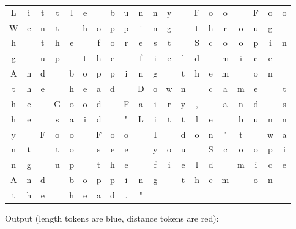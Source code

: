 \documentclass[12pt]{article}
\begin{document}
\begin{table}[H]
\ttfamily
\begin{tabular}{cccccccccccccccccccc}
L & i & t & t & l & e &  & b & u & n & n & y &  & F & o & o &  & F & o & o \\
W & e & n & t &  & h & o & p & p & i & n & g &  & t & h & r & o & u & g \\
h &  & t & h & e &  & f & o & r & e & s & t &  & S & c & o & o & p & i & n \\
g &  & u & p &  & t & h & e &  & f & i & e & l & d &  & m & i & c & e &  \\
A & n & d &  & b & o & p & p & i & n & g &  & t & h & e & m &  & o & n &  \\
t & h & e &  & h & e & a & d &  & D & o & w & n &  & c & a & m & e &  & t \\
h & e &  & G & o & o & d &  & F & a & i & r & y & , &  & a & n & d &  & s \\
h & e &  & s & a & i & d &  & " & L & i & t & t & l & e &  & b & u & n & n \\
y &  & F & o & o &  & F & o & o &  & I &  & d & o & n & ' & t &  & w & a \\
n & t &  & t & o &  & s & e & e &  & y & o & u &  & S & c & o & o & p & i \\
n & g &  & u & p &  & t & h & e &  & f & i & e & l & d &  & m & i & c & e \\
A & n & d &  & b & o & p & p & i & n & g &  & t & h & e & m &  & o & n \\
t & h & e &  & h & e & a & d & . & " &   &  &   &   &   &   &  &   &
\end{tabular}
\end{table}

Output (length tokens are blue, distance tokens are red): \\\\
\end{document}

